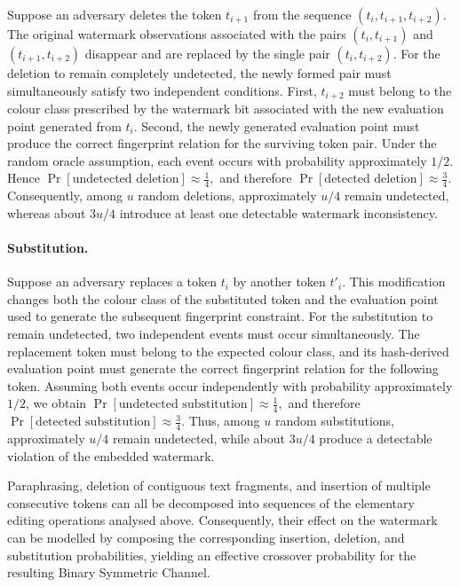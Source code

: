 \documentclass[a4paper,11pt]{llncs}
\begin{document}
Suppose an adversary deletes the token $t_{i+1}$ from the sequence
$(t_i,t_{i+1},t_{i+2})$. The original watermark observations associated
with the pairs $(t_i,t_{i+1})$ and $(t_{i+1},t_{i+2})$ disappear and are
replaced by the single pair $(t_i,t_{i+2})$.
For the deletion to remain completely undetected, the newly formed pair
must simultaneously satisfy two independent conditions. First,
$t_{i+2}$ must belong to the colour class prescribed by the watermark
bit associated with the new evaluation point generated from $t_i$.
Second, the newly generated evaluation point must produce the correct
fingerprint relation for the surviving token pair. Under the random
oracle assumption, each event occurs with probability approximately
$1/2$. Hence
$\Pr[\text{undetected deletion}]
\approx
\frac14,$
and therefore
$\Pr[\text{detected deletion}]
\approx
\frac34.$
Consequently, among $u$ random deletions, approximately $u/4$ remain
undetected, whereas about $3u/4$ introduce at least one detectable
watermark inconsistency.


\paragraph{Substitution.}

Suppose an adversary replaces a token $t_i$ by another token $t'_i$.
This modification changes both the colour class of the substituted token
and the evaluation point used to generate the subsequent fingerprint
constraint.
For the substitution to remain undetected, two independent events must
occur simultaneously. The replacement token must belong to the expected
colour class, and its hash-derived evaluation point must generate the
correct fingerprint relation for the following token. Assuming both
events occur independently with probability approximately $1/2$, we
obtain
$\Pr[\text{undetected substitution}]
\approx
\frac14,$
and therefore
$\Pr[\text{detected substitution}]
\approx
\frac34.$
Thus, among $u$ random substitutions, approximately $u/4$ remain
undetected, while about $3u/4$ produce a detectable violation of the
embedded watermark.

Paraphrasing, deletion of contiguous text fragments, and insertion of multiple consecutive tokens can all be decomposed into sequences of the elementary editing operations analysed above. Consequently, their effect on the watermark can be modelled by composing the corresponding insertion, deletion, and substitution probabilities, yielding an effective crossover probability for the resulting Binary Symmetric Channel.
\end{document}
